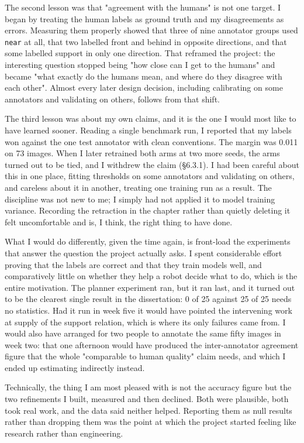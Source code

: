 The second lesson was that "agreement with the humans" is not one target. I began by treating the human labels as ground truth and my disagreements as errors. Measuring them properly showed that three of nine annotator groups used \texttt{near} at all, that two labelled front and behind in opposite directions, and that some labelled support in only one direction. That reframed the project: the interesting question stopped being "how close can I get to the humans" and became "what exactly do the humans mean, and where do they disagree with each other". Almost every later design decision, including calibrating on some annotators and validating on others, follows from that shift.

The third lesson was about my own claims, and it is the one I would most like to have learned sooner. Reading a single benchmark run, I reported that my labels won against the one test annotator with clean conventions. The margin was 0.011 on 73 images. When I later retrained both arms at two more seeds, the arms turned out to be tied, and I withdrew the claim (\S6.3.1). I had been careful about this in one place, fitting thresholds on some annotators and validating on others, and careless about it in another, treating one training run as a result. The discipline was not new to me; I simply had not applied it to model training variance. Recording the retraction in the chapter rather than quietly deleting it felt uncomfortable and is, I think, the right thing to have done.

What I would do differently, given the time again, is front-load the experiments that answer the question the project actually asks. I spent considerable effort proving that the labels are correct and that they train models well, and comparatively little on whether they help a robot decide what to do, which is the entire motivation. The planner experiment ran, but it ran last, and it turned out to be the clearest single result in the dissertation: 0 of 25 against 25 of 25 needs no statistics. Had it run in week five it would have pointed the intervening work at supply of the support relation, which is where its only failures came from. I would also have arranged for two people to annotate the same fifty images in week two: that one afternoon would have produced the inter-annotator agreement figure that the whole "comparable to human quality" claim needs, and which I ended up estimating indirectly instead.

Technically, the thing I am most pleased with is not the accuracy figure but the two refinements I built, measured and then declined. Both were plausible, both took real work, and the data said neither helped. Reporting them as null results rather than dropping them was the point at which the project started feeling like research rather than engineering.
